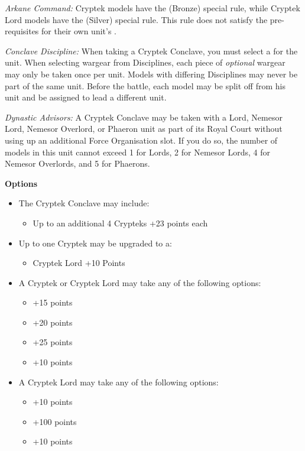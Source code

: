 \begin{minipage}[t]{0.72\textwidth}
	\textit{Arkane Command:} Cryptek models have the  (Bronze) special rule, while Cryptek Lord models have the  (Silver) special rule. This rule does not satisfy the pre-requisites for their own unit's .
	
	\textit{Conclave Discipline:} When taking a Cryptek Conclave, you must select a  for the unit. When selecting wargear from Disciplines, each piece of \textit{optional} wargear may only be taken once per unit. Models with differing Disciplines may never be part of the same unit. Before the battle, each model may be split off from his unit and be assigned to lead a different unit.
	
	\textit{Dynastic Advisors:} A Cryptek Conclave may be taken with a Lord, Nemesor Lord, Nemesor Overlord, or Phaeron unit as part of its Royal Court without using up an additional Force Organisation slot. If you do so, the number of models in this unit cannot exceed 1 for Lords, 2 for Nemesor Lords, 4 for Nemesor Overlords, and 5 for Phaerons.
	
	\vspace*{2em}
	\textbf{Options}
	\begin{itemize}
		\item The Cryptek Conclave may include:
		\begin{itemize}
			\item Up to an additional 4 Crypteks \dotfill +23 points each
		\end{itemize}
		\item Up to one Cryptek may be upgraded to a:
		\begin{itemize}
			\item Cryptek Lord \dotfill +10 Points
		\end{itemize}
		\item A Cryptek or Cryptek Lord may take any of the following options:
		\begin{itemize}
			\item {} \dotfill +15 points
			\item {} \dotfill +20 points
			\item {} \dotfill +25 points
			\item {} \dotfill +10 points
		\end{itemize}
		\item A Cryptek Lord may take any of the following options:
		\begin{itemize}
			\item {} \dotfill +10 points
			\item {} \dotfill +100 points
			\item {} \dotfill +10 points
		\end{itemize}
	\end{itemize}
\end{minipage}
